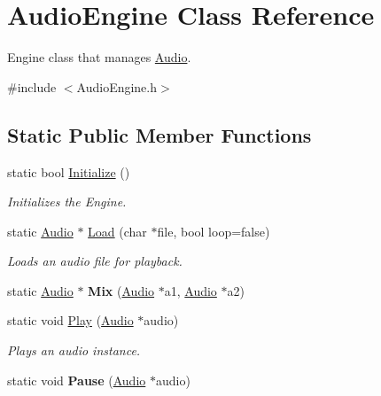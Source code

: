 \hypertarget{class_audio_engine}{}\section{Audio\+Engine Class Reference}
\label{class_audio_engine}


Engine class that manages \hyperlink{class_audio}{Audio}.  




{\ttfamily \#include $<$Audio\+Engine.\+h$>$}

\subsection*{Static Public Member Functions}
\begin{DoxyCompactItemize}
\item 
static bool \hyperlink{class_audio_engine_a32ad2899215c9f207df28efb698d68f9}{Initialize} ()
\begin{DoxyCompactList}\small\item\em Initializes the Engine. \end{DoxyCompactList}\item 
static \hyperlink{class_audio}{Audio} $\ast$ \hyperlink{class_audio_engine_a7ccb8d2fe6be78b16f457589962aedfe}{Load} (char $\ast$file, bool loop=false)
\begin{DoxyCompactList}\small\item\em Loads an audio file for playback. \end{DoxyCompactList}\item 
\mbox{\label{class_audio_engine_a35a05bdfe90425fe525037f7c6551681}} 
static \hyperlink{class_audio}{Audio} $\ast$ {\bfseries Mix} (\hyperlink{class_audio}{Audio} $\ast$a1, \hyperlink{class_audio}{Audio} $\ast$a2)
\item 
static void \hyperlink{class_audio_engine_af4471a467aa56bcad3db5a8a9ce8d733}{Play} (\hyperlink{class_audio}{Audio} $\ast$audio)
\begin{DoxyCompactList}\small\item\em Plays an audio instance. \end{DoxyCompactList}\item 
\mbox{\label{class_audio_engine_a3729a1c2642a760385a5398472e49c2d}} 
static void {\bfseries Pause} (\hyperlink{class_audio}{Audio} $\ast$audio)
\item 

\end{DoxyCompactItemize}
